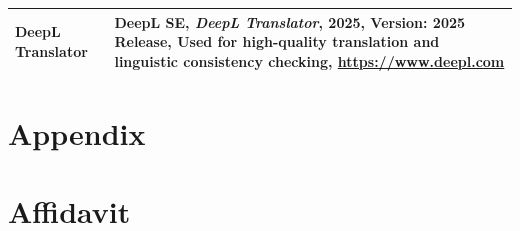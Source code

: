 \documentclass[12pt,a4paper]{article}
\begin{document}
\begin{table}[H]
\begin{threeparttable}
\begin{tabular}{p{4cm} p{12cm}}
            DeepL Translator                                                  &
            DeepL SE, \textit{DeepL Translator}, 2025, Version: 2025 Release, Used for high-quality translation and linguistic consistency checking, \url{https://www.deepl.com} \\
            \bottomrule
        \end{tabular}
    \end{threeparttable}
\end{table}

\newpage
\appendix
\section{Appendix}

\newpage

\section{Affidavit}

\end{document}
